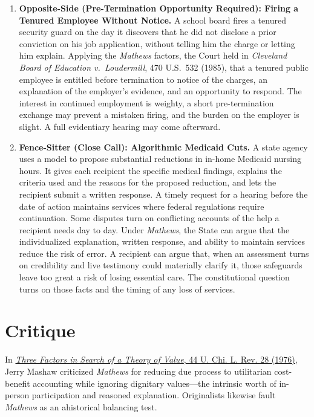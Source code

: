 \documentclass[12pt]{article}
\begin{document}
\begin{enumerate}
\item \textbf{Opposite-Side (Pre-Termination Opportunity Required): Firing a Tenured Employee Without Notice.} A school board fires a tenured security guard on the day it discovers that he did not disclose a prior conviction on his job application, without telling him the charge or letting him explain. Applying the \textit{Mathews} factors, the Court held in \textit{Cleveland Board of Education v.\ Loudermill}, 470 U.S.\ 532 (1985), that a tenured public employee is entitled before termination to notice of the charges, an explanation of the employer's evidence, and an opportunity to respond. The interest in continued employment is weighty, a short pre-termination exchange may prevent a mistaken firing, and the burden on the employer is slight. A full evidentiary hearing may come afterward.

\item \textbf{Fence-Sitter (Close Call): Algorithmic Medicaid Cuts.} A state agency uses a model to propose substantial reductions in in-home Medicaid nursing hours. It gives each recipient the specific medical findings, explains the criteria used and the reasons for the proposed reduction, and lets the recipient submit a written response. A timely request for a hearing before the date of action maintains services where federal regulations require continuation. Some disputes turn on conflicting accounts of the help a recipient needs day to day. Under \textit{Mathews}, the State can argue that the individualized explanation, written response, and ability to maintain services reduce the risk of error. A recipient can argue that, when an assessment turns on credibility and live testimony could materially clarify it, those safeguards leave too great a risk of losing essential care. The constitutional question turns on those facts and the timing of any loss of services.

\end{enumerate}

\section{Critique}
In \href{https://chicagounbound.uchicago.edu/uclrev/vol44/iss1/5/}{\emph{Three Factors in Search of a Theory of Value}, 44 U. Chi. L. Rev. 28 (1976)}, Jerry Mashaw criticized \emph{Mathews} for reducing due process to utilitarian cost-benefit accounting while ignoring dignitary values---the intrinsic worth of in-person participation and reasoned explanation. Originalists likewise fault \emph{Mathews} as an ahistorical balancing test.
\end{document}
